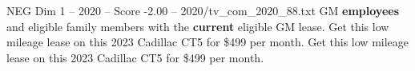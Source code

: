 \begin{textsample}{NEG Dim 1 – 2020 – Score -2.00 – 2020/tv\_com\_2020\_88.txt}  \label{ex:f1_neg_005}
GM \textbf{employees} and eligible family members with the \textbf{current} eligible GM lease.
Get this low mileage lease on this 2023 Cadillac CT5 for \$499 per month.
Get this low mileage lease on this 2023 Cadillac CT5 for \$499 per month.

\end{textsample}
